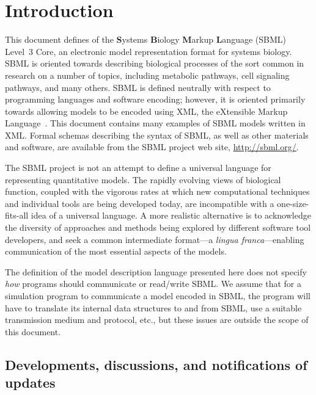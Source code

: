 
\section{Introduction}
\label{sec:introduction}

This document defines \thisVnum of the \textbf{S}ystems
\textbf{B}iology \textbf{M}arkup \textbf{L}anguage (SBML) Level~3
Core, an electronic model representation format for systems
biology.  SBML is oriented towards describing biological processes
of the sort common in research on a number of topics, including
metabolic pathways, cell signaling pathways, and many others.
SBML is defined neutrally with respect to programming languages
and software encoding; however, it is oriented primarily towards
allowing models to be encoded using XML, the eXtensible Markup
Language~\citep{bray:2004}.  This document contains many examples
of SBML models written in XML.  Formal schemas describing the
syntax of SBML, as well as other materials and software, are
available from the SBML project web site, \url{http://sbml.org/}.

The SBML project is not an attempt to define a universal language
for representing quantitative models.  The rapidly evolving views
of biological function, coupled with the vigorous rates at which
new computational techniques and individual tools are being
developed today, are incompatible with a one-size-fits-all idea of
a universal language. A more realistic alternative is to
acknowledge the diversity of approaches and methods being explored
by different software tool developers, and seek a common
intermediate format---a \emph{lingua franca}---enabling
communication of the most essential aspects of the models.

The definition of the model description language presented here
does not specify \emph{how} programs should communicate or
read/write SBML.  We assume that for a simulation program to
communicate a model encoded in SBML, the program will have to
translate its internal data structures to and from SBML, use a
suitable transmission medium and protocol, etc., but these issues
are outside the scope of this document.


\subsection{Developments, discussions, and notifications of updates}

